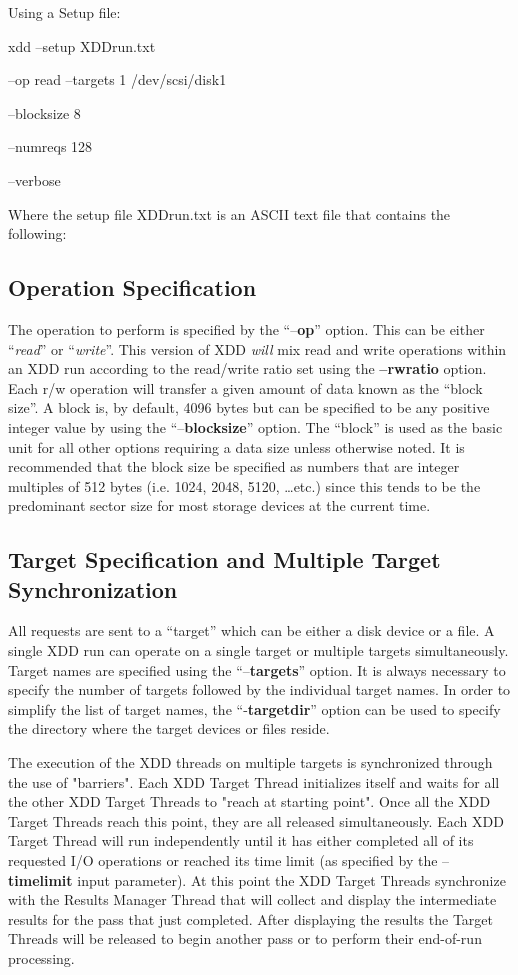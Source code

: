 Using a Setup file:

xdd --setup XDDrun.txt

--op read --targets 1 /dev/scsi/disk1

--blocksize 8

--numreqs 128

--verbose

Where the setup file XDDrun.txt is an ASCII text file that contains the following:

\subsection{Operation Specification}\label{operation-specification}

The operation to perform is specified by the ``--\textbf{op}'' option. This can be either ``\emph{read}'' or ``\emph{write}''. This version of XDD \emph{will} mix read and write operations within an XDD run according to the read/write ratio set using the \textbf{--rwratio} option. Each r/w operation will transfer a given amount of data known as the ``block size''. A block is, by default, 4096 bytes but can be specified to be any positive integer value by using the ``--\textbf{blocksize}'' option. The ``block'' is used as the basic unit for all other options requiring a data size unless otherwise noted. It is recommended that the block size be specified as numbers that are integer multiples of 512 bytes (i.e. 1024, 2048, 5120, \ldots etc.) since this tends to be the predominant sector size for most storage devices at the current time.

\subsection{Target Specification and Multiple Target Synchronization}\label{target-specification-and-multiple-target-synchronization}

All requests are sent to a ``target'' which can be either a disk device or a file. A single XDD run can operate on a single target or multiple targets simultaneously. Target names are specified using the ``--\textbf{targets}'' option. It is always necessary to specify the number of targets followed by the individual target names. In order to simplify the list of target names, the ``-\textbf{targetdir}'' option can be used to specify the directory where the target devices or files reside.

The execution of the XDD threads on multiple targets is synchronized through the use of "barriers". Each XDD Target Thread initializes itself and waits for all the other XDD Target Threads to "reach at starting point". Once all the XDD Target Threads reach this point, they are all released simultaneously. Each XDD Target Thread will run independently until it has either completed all of its requested I/O operations or reached its time limit (as specified by the --\textbf{timelimit} input parameter). At this point the XDD Target Threads synchronize with the Results Manager Thread that will collect and display the intermediate results for the pass that just completed. After displaying the results the Target Threads will be released to begin another pass or to perform their end-of-run processing.

